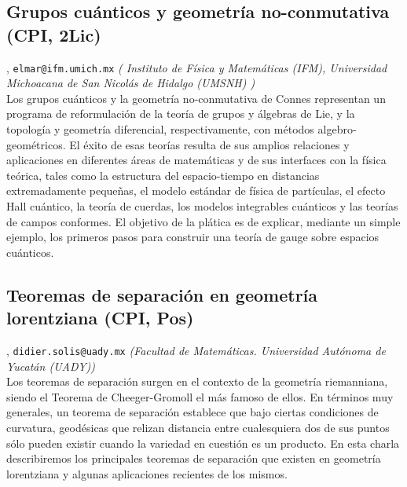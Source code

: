 \subsection{\sffamily Grupos cu\'anticos y geometr\'ia no-conmutativa {\footnotesize (CPI, 2Lic)}} \label{reg-773} 
, {\tt elmar@ifm.umich.mx}  {\slshape ( Instituto de F\'isica y Matem\'aticas (IFM),  Universidad Michoacana de San Nicol\'as de Hidalgo (UMSNH) )}\\
          \noindent Los grupos cu\'anticos y la geometr\'ia no-conmutativa de Connes representan un programa de reformulaci\'on de la teor\'ia de grupos y \'algebras de Lie, y la topolog\'ia y geometr\'ia diferencial, respectivamente, con m\'etodos algebro-geom\'etricos. El \'exito de esas teor\'ias resulta de sus amplios relaciones y aplicaciones en diferentes \'areas de matem\'aticas y de sus interfaces con la f\'isica te\'orica, tales como la estructura del espacio-tiempo en distancias extremadamente peque\~nas,  el modelo est\'andar de f\'isica de part\'iculas, el efecto Hall cu\'antico, la teor\'ia de cuerdas, los modelos integrables cu\'anticos y las teor\'ias de campos conformes. El objetivo de la pl\'atica es de explicar, mediante un simple ejemplo, los primeros pasos para construir una teor\'ia de gauge sobre espacios cu\'anticos.
\subsection{\sffamily Teoremas de separaci\'on en geometr\'ia lorentziana {\footnotesize (CPI, Pos)}} \label{reg-1566} 
, {\tt didier.solis@uady.mx}  {\slshape (Facultad de Matem\'aticas. Universidad Aut\'onoma de Yucat\'an (UADY))}\\
          \noindent Los teoremas de separaci\'on surgen en el contexto de la geometr\'ia riemanniana, siendo el Teorema de Cheeger-Gromoll el m\'as famoso de ellos. En t\'erminos muy generales, un teorema de separaci\'on establece que bajo ciertas condiciones de curvatura, geod\'esicas que relizan distancia entre cualesquiera dos de sus puntos s\'olo pueden existir cuando la variedad en cuesti\'on es un producto.  En esta charla describiremos los principales teoremas de separaci\'on que existen en geometr\'ia lorentziana y algunas aplicaciones recientes de los mismos.
